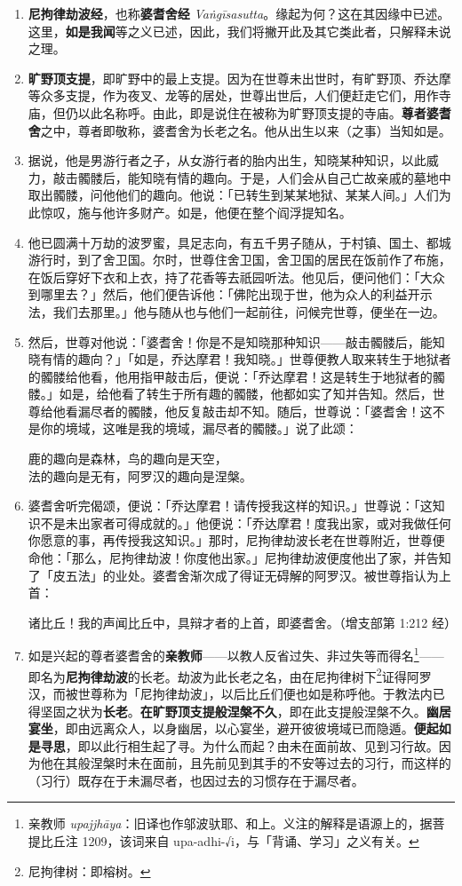 \begin{enumerate}\item \textbf{尼拘律劫波经}，也称\textbf{婆耆舍经} \textit{Vaṅgīsasutta}。缘起为何？这在其因缘中已述。这里，\textbf{如是我闻}等之义已述，因此，我们将撇开此及其它类此者，只解释未说之理。
\item \textbf{旷野顶支提}，即旷野中的最上支提。因为在世尊未出世时，有旷野顶、乔达摩等众多支提，作为夜叉、龙等的居处，世尊出世后，人们便赶走它们，用作寺庙，但仍以此名称呼。由此，即是说住在被称为旷野顶支提的寺庙。\textbf{尊者婆耆舍}之中，尊者即敬称，婆耆舍为长老之名。他从出生以来（之事）当知如是。
\item 据说，他是男游行者之子，从女游行者的胎内出生，知晓某种知识，以此威力，敲击髑髅后，能知晓有情的趣向。于是，人们会从自己亡故亲戚的墓地中取出髑髅，问他他们的趣向。他说：「已转生到某某地狱、某某人间。」人们为此惊叹，施与他许多财产。如是，他便在整个阎浮提知名。
\item 他已圆满十万劫的波罗蜜，具足志向，有五千男子随从，于村镇、国土、都城游行时，到了舍卫国。尔时，世尊住舍卫国，舍卫国的居民在饭前作了布施，在饭后穿好下衣和上衣，持了花香等去祇园听法。他见后，便问他们：「大众到哪里去？」然后，他们便告诉他：「佛陀出现于世，他为众人的利益开示法，我们去那里。」他与随从也与他们一起前往，问候完世尊，便坐在一边。
\item 然后，世尊对他说：「婆耆舍！你是不是知晓那种知识——敲击髑髅后，能知晓有情的趣向？」「如是，乔达摩君！我知晓。」世尊便教人取来转生于地狱者的髑髅给他看，他用指甲敲击后，便说：「乔达摩君！这是转生于地狱者的髑髅。」如是，给他看了转生于所有趣的髑髅，他都如实了知并告知。然后，世尊给他看漏尽者的髑髅，他反复敲击却不知。随后，世尊说：「婆耆舍！这不是你的境域，这唯是我的境域，漏尽者的髑髅。」说了此颂：\begin{quoting}鹿的趣向是森林，鸟的趣向是天空，\\法的趣向是无有，阿罗汉的趣向是涅槃。\end{quoting}
\item 婆耆舍听完偈颂，便说：「乔达摩君！请传授我这样的知识。」世尊说：「这知识不是未出家者可得成就的。」他便说：「乔达摩君！度我出家，或对我做任何你愿意的事，再传授我这知识。」那时，尼拘律劫波长老在世尊附近，世尊便命他：「那么，尼拘律劫波！你度他出家。」尼拘律劫波便度他出了家，并告知了「皮五法」的业处。婆耆舍渐次成了得证无碍解的阿罗汉。被世尊指认为上首：\begin{quoting}诸比丘！我的声闻比丘中，具辩才者的上首，即婆耆舍。（增支部第 1:212 经）\end{quoting}
\item 如是兴起的尊者婆耆舍的\textbf{亲教师}——以教人反省过失、非过失等而得名\footnote{亲教师 \textit{upajjhāya}：旧译也作邬波驮耶、和上。义注的解释是语源上的，据菩提比丘注 1209，该词来自 upa-adhi-√i，与「背诵、学习」之义有关。}——即名为\textbf{尼拘律劫波}的长老。劫波为此长老之名，由在尼拘律树下\footnote{尼拘律树：即榕树。}证得阿罗汉，而被世尊称为「尼拘律劫波」，以后比丘们便也如是称呼他。于教法内已得坚固之状为\textbf{长老}。\textbf{在旷野顶支提般涅槃不久}，即在此支提般涅槃不久。\textbf{幽居宴坐}，即由远离众人，以身幽居，以心宴坐，避开彼彼境域已而隐遁。\textbf{便起如是寻思}，即以此行相生起了寻。为什么而起？由未在面前故、见到习行故。因为他在其般涅槃时未在面前，且先前见到其手的不安等过去的习行，而这样的（习行）既存在于未漏尽者，也因过去的习惯存在于漏尽者。

\end{enumerate}
